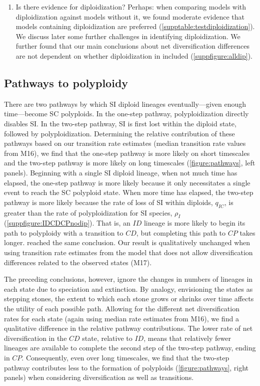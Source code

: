 \begin{enumerate}
    \item Is there evidence for diploidization?
    Perhaps: when comparing models with diploidization against models without it, we found moderate evidence that models containing diploidization are preferred (\cref{supptable:testdiploidization}).
    We discuss later some further challenges in identifying diploidization.
    We further found that our main conclusions about net diversification differences are not dependent on whether diploidization in included (\cref{suppfigure:alldip}).

\end{enumerate}

\subsection{Pathways to polyploidy}

There are two pathways by which SI diploid lineages eventually---given enough time---become SC polyploids.
In the one-step pathway, polyploidization directly disables SI.
In the two-step pathway, SI is first lost within the diploid state, followed by polyploidization.
Determining the relative contribution of these pathways based on our transition rate estimates (median transition rate values from M16), we find that the one-step pathway is more likely on short timescales and the two-step pathway is more likely on long timescales (\cref{figure:pathways}, left panels).
Beginning with a single SI diploid lineage, when not much time has elapsed, the one-step pathway is more likely because it only necessitates a single event to reach the SC polyploid state.
When more time has elapsed, the two-step pathway is more likely because the rate of loss of SI within diploids, $q_{IC}$, is greater than the rate of polyploidization for SI species, $\rho_I$ (\cref{suppfigure:IDCDCPnodip}).
That is, an $ID$ lineage is more likely to begin its path to polyploidy with a transition to $CD$, but completing this path to $CP$ takes longer.
 reached the same conclusion.
Our result is qualitatively unchanged when using transition rate estimates from the model that does not allow diversification differences related to the observed states (M17).

The preceding conclusions, however, ignore the changes in numbers of lineages in each state due to speciation and extinction.
By analogy, envisioning the states as stepping stones, the extent to which each stone grows or shrinks over time affects the utility of each possible path.
Allowing for the different net diversification rates for each state (again using median rate estimates from M16), we find a qualitative difference in the relative pathway contributions.
The lower rate of net diversification in the $CD$ state, relative to $ID$, means that relatively fewer lineages are available to complete the second step of the two-step pathway, ending in $CP$.
Consequently, even over long timescales, we find that the two-step pathway contributes less to the formation of polyploids (\cref{figure:pathways}, right panels) when considering diversification as well as transitions.

